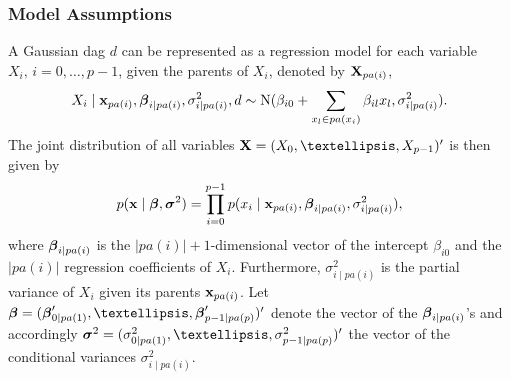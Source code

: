 \subsubsection*{Model Assumptions }

A Gaussian dag $d$ can be represented as a regression model for each variable $X_i, \, i=0, \dots, p-1$, given the parents of
$X_i$, denoted by $\mathbf{X}_{pa(i)}$,
%
\begin{eqnarray}
X_i \mid \mathbf{x}_{pa(i)},  \mbox{\boldmath $\beta$}_{i \mid pa(i)}, \sigma_{i \mid
pa(i)}^2, d \sim  \mbox{N}(\beta_{i0} + \sum_{x_l \in pa(x_i)}
\beta_{il}x_l, \sigma_{i \mid pa(i)}^2). \nonumber
\end{eqnarray}
%
The joint distribution of all variables ${\bf X} = (X_0, \dots,
X_{p-1})'$ is then given by
%
\begin{eqnarray}
p(\mathbf{x} \mid  \mbox{\boldmath $\beta$}, \mbox{\boldmath $\sigma$}^2) = \prod_{i=0}^{p-1} p(x_i \mid
\mathbf{x}_{pa(i)}, \mbox{\boldmath $\beta$}_{i \mid pa(i)}, \sigma_{i \mid pa(i)}^2),
\nonumber
\end{eqnarray}
%
where $\mbox{\boldmath $\beta$}_{i \mid pa(i)}$ is the $|pa(i)|+1$-dimensional
vector of the intercept $\beta_{i0}$ and the $|pa(i)|$ regression
coefficients of $X_i$. Furthermore, $\sigma_{i \mid pa(i)}^2$ is
the partial variance of $X_i$ given its parents $\mathbf{x}_{pa(i)}$. Let
$\mbeta = (\mbeta'_{0 \mid pa(1)}, \dots, \mbeta'_{p-1 \mid
pa(p)})'$ denote the vector of the $\mbox{\boldmath $\beta$}_{i \mid pa(i)}$'s and
accordingly $\msigma^2 = (\sigma_{0 \mid pa(1)}^2, \dots,
\sigma_{p-1 \mid pa(p)}^2)'$ the vector of the conditional
variances $\sigma_{i \mid pa(i)}^2$.

\bigskip

